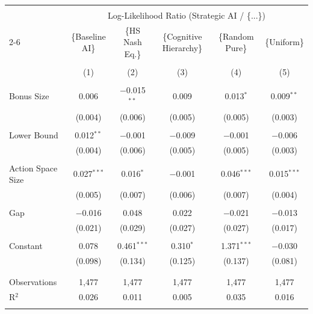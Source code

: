 \begin{tabular}{@{\extracolsep{5pt}}lccccc} 
\\[-1.8ex]\hline 
\hline \\[-1.8ex] 
 & \multicolumn{5}{c}{Log-Likelihood Ratio (Strategic AI / \{...\})} \\ 
\cline{2-6} 
 & \{Baseline AI\} & \{HS Nash Eq.\} & \{Cognitive Hierarchy\} & \{Random Pure\} & \{Uniform\} \\ 
\\[-1.8ex] & (1) & (2) & (3) & (4) & (5)\\ 
\hline \\[-1.8ex] 
 Bonus Size & 0.006 & $-$0.015$^{**}$ & 0.009 & 0.013$^{*}$ & 0.009$^{**}$ \\ 
  & (0.004) & (0.006) & (0.005) & (0.005) & (0.003) \\ 
  & & & & & \\ 
 Lower Bound & 0.012$^{**}$ & $-$0.001 & $-$0.009 & $-$0.001 & $-$0.006 \\ 
  & (0.004) & (0.006) & (0.005) & (0.005) & (0.003) \\ 
  & & & & & \\ 
 Action Space Size & 0.027$^{***}$ & 0.016$^{*}$ & $-$0.001 & 0.046$^{***}$ & 0.015$^{***}$ \\ 
  & (0.005) & (0.007) & (0.006) & (0.007) & (0.004) \\ 
  & & & & & \\ 
 Gap & $-$0.016 & 0.048 & 0.022 & $-$0.021 & $-$0.013 \\ 
  & (0.021) & (0.029) & (0.027) & (0.027) & (0.017) \\ 
  & & & & & \\ 
 Constant & 0.078 & 0.461$^{***}$ & 0.310$^{*}$ & 1.371$^{***}$ & $-$0.030 \\ 
  & (0.098) & (0.134) & (0.125) & (0.137) & (0.081) \\ 
  & & & & & \\ 
\hline \\[-1.8ex] 
Observations & 1,477 & 1,477 & 1,477 & 1,477 & 1,477 \\ 
R$^{2}$ & 0.026 & 0.011 & 0.005 & 0.035 & 0.016 \\ 
\hline 
\hline \\[-1.8ex] 
\end{tabular}
